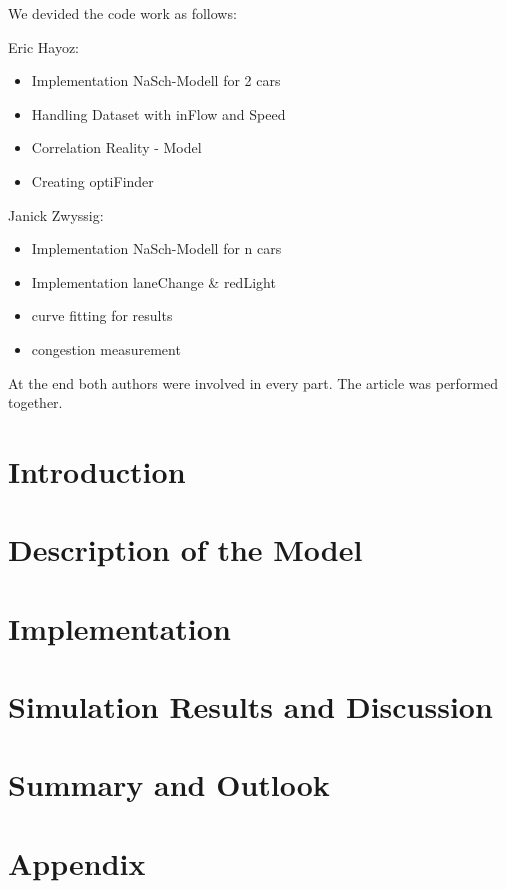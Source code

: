 \documentclass[11pt]{article}
\begin{document}
We devided the code work as follows:

Eric Hayoz:
\begin{itemize}
\item Implementation NaSch-Modell for 2 cars 
\item Handling Dataset with inFlow and Speed 
\item Correlation Reality - Model
\item Creating optiFinder 
\end{itemize}

Janick Zwyssig:
\begin{itemize}
\item Implementation NaSch-Modell for n cars
\item Implementation laneChange \& redLight
\item curve fitting for results
\item congestion measurement
\end{itemize}

At the end both authors were involved in every part. The article was performed together.

\section{Introduction}



\section{Description of the Model}




\section{Implementation}






\section{Simulation Results and Discussion}



\section{Summary and Outlook}



\section{Appendix}


\end{document}
